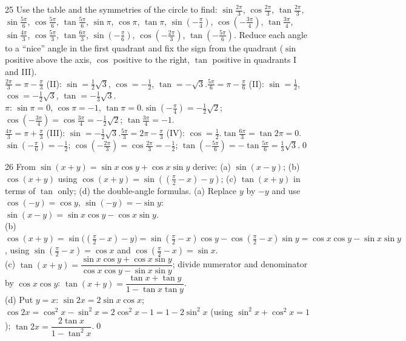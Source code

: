 \begin{bookex}{25}
Use the table and the symmetries of the circle to find: $\sin\frac{2\pi}3$, $\cos\frac{2\pi}3$, $\tan\frac{2\pi}3$, $\sin\frac{5\pi}6$, $\cos\frac{5\pi}6$, $\tan\frac{5\pi}6$, $\sin\pi$, $\cos\pi$, $\tan\pi$, $\sin(-\frac\pi4)$, $\cos(-\frac{3\pi}4)$, $\tan\frac{3\pi}4$, $\sin\frac{4\pi}3$, $\cos\frac{5\pi}3$, $\tan\frac{6\pi}3$, $\sin(-\frac\pi6)$, $\cos(-\frac{2\pi}3)$, $\tan(-\frac{5\pi}6)$.
\solution
Reduce each angle to a ``nice'' angle in the first quadrant and fix the sign from the quadrant ($\sin$ positive above the axis, $\cos$ positive to the right, $\tan$ positive in quadrants I and III).\\
$\frac{2\pi}3=\pi-\frac\pi3$ (II): $\sin=\frac12\sqrt3$, $\cos=-\frac12$, $\tan=-\sqrt3$.\quad $\frac{5\pi}6=\pi-\frac\pi6$ (II): $\sin=\frac12$, $\cos=-\frac12\sqrt3$, $\tan=-\frac13\sqrt3$.\\
$\pi$: $\sin\pi=0$, $\cos\pi=-1$, $\tan\pi=0$.\quad $\sin(-\frac\pi4)=-\frac12\sqrt2$; $\cos(-\frac{3\pi}4)=\cos\frac{3\pi}4=-\frac12\sqrt2$; $\tan\frac{3\pi}4=-1$.\\
$\frac{4\pi}3=\pi+\frac\pi3$ (III): $\sin=-\frac12\sqrt3$.\quad $\frac{5\pi}3=2\pi-\frac\pi3$ (IV): $\cos=\frac12$.\quad $\tan\frac{6\pi}3=\tan2\pi=0$.\\
$\sin(-\frac\pi6)=-\frac12$; $\cos(-\frac{2\pi}3)=\cos\frac{2\pi}3=-\frac12$; $\tan(-\frac{5\pi}6)=-\tan\frac{5\pi}6=\frac13\sqrt3$.\qed
\end{bookex}

\begin{bookex}{26}
From $\sin(x+y)=\sin x\cos y+\cos x\sin y$ derive: (a) $\sin(x-y)$; (b) $\cos(x+y)$ using $\cos(x+y)=\sin((\frac\pi2-x)-y)$; (c) $\tan(x+y)$ in terms of $\tan$ only; (d) the double-angle formulas.
\solution
(a) Replace $y$ by $-y$ and use $\cos(-y)=\cos y$, $\sin(-y)=-\sin y$: $\sin(x-y)=\sin x\cos y-\cos x\sin y$.\\
(b) $\cos(x+y)=\sin\big((\tfrac\pi2-x)-y\big)=\sin(\tfrac\pi2-x)\cos y-\cos(\tfrac\pi2-x)\sin y=\cos x\cos y-\sin x\sin y$, using $\sin(\frac\pi2-x)=\cos x$ and $\cos(\frac\pi2-x)=\sin x$.\\
(c) $\tan(x+y)=\dfrac{\sin x\cos y+\cos x\sin y}{\cos x\cos y-\sin x\sin y}$; divide numerator and denominator by $\cos x\cos y$: $\tan(x+y)=\dfrac{\tan x+\tan y}{1-\tan x\tan y}$.\\
(d) Put $y=x$: $\sin2x=2\sin x\cos x$; $\cos2x=\cos^2x-\sin^2x=2\cos^2x-1=1-2\sin^2x$ (using $\sin^2x+\cos^2x=1$); $\tan2x=\dfrac{2\tan x}{1-\tan^2x}$.\qed
\end{bookex}

